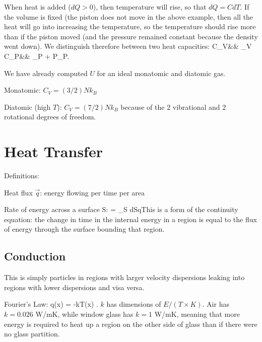 \documentclass[11pt]{book}
\begin{document}
When heat is added ($dQ>0$), then temperature will rise, so that $dQ=CdT$. If the volume is fixed (the piston does not move in the above example, then all the heat will go into increasing the temperature, so the temperature should rise more than if the piston moved (and the pressure remained constant because the density went down). We distinguish therefore between two heat capacities:
\bea
C_V&\equiv& \Big\vert_V
\vs
C_P&\equiv& \Big\vert_P + P\Big\vert_P.
\eea

We have already computed $U$ for an ideal monatomic and diatomic gas. 
\bei
\item Monatomic: $C_V = (3/2) Nk_B$
\item Diatomic (high $T$): $C_V=(7/2) N k_B$ because of the 2 vibrational and 2 rotational degrees of freedom.
\eei

\chapter{Heat Transfer}

Definitions:
\bei
\item Heat flux $\vec q$: energy flowing per time per area
\item Rate of energy across a surface S: \be{} = \int_S d\vec S\cdot \vec q\ee This is a form of the continuity equation: the change in time in the internal energy in a region is equal to the flux of energy through the surface bounding that region.
\eei

\section{Conduction}
This is simply particles in regions with larger velocity dispersions leaking into regions with lower dispersions and visa versa.

Fourier's Law: \be \vec q(\vec x) = -k\nabla T(\vec x)
.\ee
$k$ has dimensions of $E/(T\times K)$. Air has $k=0.026$ W/mK, while window glass has $k=1$ W/mK, meaning that more energy is required to heat up a region on the other side of glass than if there were no glass partition.
\end{document}
